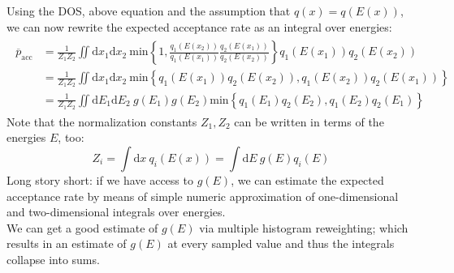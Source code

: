 \documentclass{article}
\renewcommand{\d}{\mathrm{d}}
\begin{document}
Using the DOS, above equation and the assumption that $q(x)=q(E(x))$, we can now rewrite the expected acceptance rate as an integral over energies:
\begin{gather}
\begin{aligned}
  \overline{p}_{\mathrm{acc}} &= \frac{1}{Z_1 Z_2} \iint \d x_1 \d x_2 \ \mathrm{min}\left\{1, \frac{q_1(E(x_2))}{q_1(E(x_1))} \frac{q_2(E(x_1))}{q_2(E(x_2))}\right\} q_1(E(x_1)) q_2(E(x_2)) \\
                              &= \frac{1}{Z_1 Z_2} \iint \d x_1 \d x_2 \ \mathrm{min}\left\{q_1(E(x_1)) q_2(E(x_2)), q_1(E(x_2)) q_2(E(x_1))\right\} \\
  &= \frac{1}{Z_1 Z_2} \iint \d E_1 \d E_2 \ g(E_1) g(E_2) \mathrm{min}\left\{q_1(E_1) q_2(E_2), q_1(E_2) q_2(E_1)\right\}
\end{aligned}
\end{gather}
Note that the normalization constants $Z_1, Z_2$ can be written in terms of the energies $E$, too:
\begin{equation}
  Z_i = \int \d x \ q_i(E(x)) = \int \d E \ g(E) q_i(E)
\end{equation}
Long story short: if we have access to $g(E)$, we can estimate the expected acceptance rate by means of simple numeric approximation of one-dimensional and two-dimensional integrals over energies.\\
We can get a good estimate of $g(E)$ via multiple histogram reweighting\cite{habeck_dos_wham}; which results in an estimate of $g(E)$ at every sampled value and thus the integrals collapse into sums.\\
\end{document}

